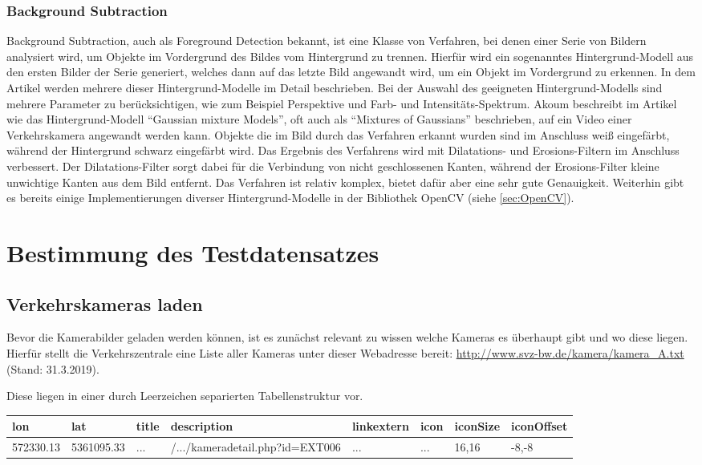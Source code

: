 \subsubsection{Background Subtraction}
Background Subtraction, auch als Foreground Detection bekannt, ist eine Klasse von Verfahren, bei denen einer Serie von Bildern analysiert wird, um Objekte im Vordergrund des Bildes vom Hintergrund zu trennen. 
Hierfür wird ein sogenanntes Hintergrund-Modell aus den ersten Bilder der Serie generiert, welches dann auf das letzte Bild angewandt wird, um ein Objekt im Vordergrund zu erkennen.
In dem Artikel \cite{mcivor2000background} werden mehrere dieser Hintergrund-Modelle im Detail beschrieben.
Bei der Auswahl des geeigneten Hintergrund-Modells sind mehrere Parameter zu berücksichtigen, wie zum Beispiel Perspektive und Farb- und Intensitäts-Spektrum.
Akoum beschreibt im Artikel \cite{akoumBSIP} wie das Hintergrund-Modell "`Gaussian mixture Models"', oft auch als "`Mixtures of Gaussians"' beschrieben, auf ein Video einer Verkehrskamera angewandt werden kann.
Objekte die im Bild durch das Verfahren erkannt wurden sind im Anschluss weiß eingefärbt, während der Hintergrund schwarz eingefärbt wird.
Das Ergebnis des Verfahrens wird mit Dilatations- und Erosions-Filtern im Anschluss verbessert. 
Der Dilatations-Filter sorgt dabei für die Verbindung von nicht geschlossenen Kanten, während der Erosions-Filter kleine unwichtige Kanten aus dem Bild entfernt.
Das Verfahren ist relativ komplex, bietet dafür aber eine sehr gute Genauigkeit. 
Weiterhin gibt es bereits einige Implementierungen diverser Hintergrund-Modelle in der Bibliothek OpenCV (siehe \ref{sec:OpenCV}).

\section{Bestimmung des Testdatensatzes}
\subsection{Verkehrskameras laden}
Bevor die Kamerabilder geladen werden können, ist es zunächst relevant zu wissen welche Kameras es überhaupt gibt und wo diese liegen.
Hierfür stellt die Verkehrszentrale eine Liste aller Kameras unter dieser Webadresse bereit: \url{http://www.svz-bw.de/kamera/kamera_A.txt} (Stand: 31.3.2019).

Diese liegen in einer durch Leerzeichen separierten Tabellenstruktur vor.

\begin{center}
\scriptsize
    \begin{tabular}{ | l | l | l | l | l | l | l | l |}
    \hline
		lon & lat & title & description & linkextern & icon & iconSize & iconOffset \\ \hline
    572330.13 &
		5361095.33 &
		... &
		/.../kameradetail.php?id=EXT006 &
		... &
		... &
		16,16 &
		-8,-8 \\
    \hline
    \end{tabular}
\end{center}

